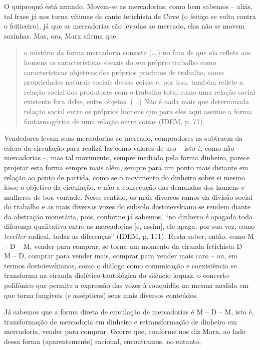 O quiproquó está armado. Movem-se as mercadorias, como bem sabemos --
aliás, tal frase já nos torna vítimas do canto fetichista de Circe (o
feitiço se volta contra o feiticeiro), já que as mercadorias são levadas
ao mercado, elas não se movem sozinhas. Mas, ora, Marx afirma que

\begin{quote}
o mistério da forma mercadoria consiste (...) no fato de que ela reflete
aos homens as características sociais do seu próprio trabalho como
características objetivas dos próprios produtos de trabalho, como
propriedades naturais sociais dessas coisas e, por isso, também reflete
a relação social dos produtores com o trabalho total como uma relação
social existente fora deles, entre objetos. (...) Não é nada mais que
determinada relação social entre os próprios homens que para eles aqui
assume a forma fantasmagórica de uma relação entre coisas (IDEM, p. 71).
\end{quote}

Vendedores levam suas mercadorias ao mercado, compradores as subtraem da
esfera da circulação para realizá-las como valores de uso -- isto é,
como não-mercadorias --, mas tal movimento, sempre mediado pela forma
dinheiro, parece projetar esta forma sempre mais além, sempre para um
ponto mais distante em relação ao ponto de partida, como se o movimento
do dinheiro sobre si mesmo fosse o objetivo da circulação, e não a
consecução das demandas dos homens e mulheres de boa vontade. Nesse
sentido, os mais diversos ramos da divisão social do trabalho e as mais
diversas vozes do subsolo dostoievskiano se rendem diante da abstração
monetária, pois, conforme já sabemos, ``no dinheiro é apagada toda
diferença qualitativa entre as mercadorias {[}e, assim{]}, ele apaga,
por sua vez, como \emph{leveller} radical, todas as diferenças'' (IDEM,
p. 111). Resta saber, então, como M -- D -- M, vender para comprar, se
torna um momento da ciranda fetichista D -- M -- D, comprar para vender
mais, comprar para vender mais caro -- ou, em termos dostoievskianos,
como o diálogo como comunicação e coexistência se transforma na ciranda
dialético-tautológica do silêncio loquaz, o concerto polifônico que
permite a expressão das vozes à rouquidão na mesma medida em que torna
fungíveis (e assépticos) seus mais diversos conteúdos.

Já sabemos que a forma direta de circulação de mercadorias é M -- D --
M, isto é, transformação de mercadoria em dinheiro e retransformação de
dinheiro em mercadoria, vender para comprar. Ocorre que, conforme nos
diz Marx, ao lado dessa forma (aparentemente) racional, encontramos, no
entanto,

